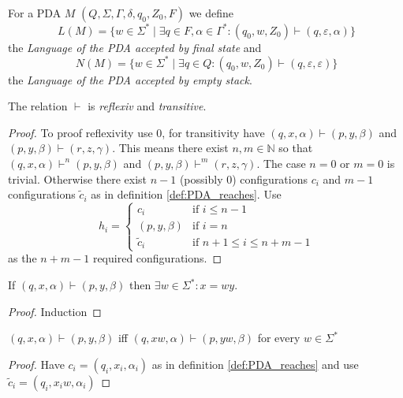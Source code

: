 \begin{definition}
  \label{def:PDA_language}
  For a PDA $M$ $(Q,\Sigma,\Gamma,\delta,q_0,Z_0,F)$ we define $$L(M)=\{w\in\Sigma^*\mid
  \exists q\in F,\alpha\in\Gamma^*: (q_0,w,Z_0)\vdash(q,\varepsilon,\alpha)\}$$ the
  \emph {Language of the PDA accepted by final state} and $$N(M)=\{w\in\Sigma^*\mid
  \exists q\in Q: (q_0,w,Z_0)\vdash(q,\varepsilon,\varepsilon)\}$$ the
  \emph {Language of the PDA accepted by empty stack}.

\end{definition}
\begin{theorem}\label{thm:PDA_reaches}
  The relation $\vdash$ is \emph{reflexiv} and \emph{transitive}.
\end{theorem}
\begin{proof}
  To proof reflexivity use $0$,
  for transitivity have  $(q,x,\alpha)\vdash(p,y,\beta)$ and
  $(p,y,\beta)\vdash(r,z,\gamma)$. This means there exist $n,m\in\mathbb{N}$ so that
  $(q,x,\alpha)\vdash^n(p,y,\beta)$ and $(p,y,\beta)\vdash^m(r,z,\gamma)$.
  The case $n=0$ or $m=0$ is trivial. Otherwise there exist $n-1$ (possibly $0$) configurations
  $c_i$ and $m-1$ configurations $\tilde{c}_i$ as in definition \ref{def:PDA_reaches}.
  Use
  $$
  h_i =
  \begin{cases}
    c_i          & \text{if } i\le n-1 \\
    (p,y,\beta) & \text{if } i = n \\
    \tilde{c}_i  & \text{if } n+1\le i \le n+m-1
  \end{cases}
  $$
  as the $n+m-1$ required configurations.
\end{proof}
\begin{theorem}\label{thm:PDA_reaches_input_decreasing}
  If $(q,x,\alpha)\vdash(p,y,\beta)$ then $\exists w\in\Sigma^*: x=wy$.
\end{theorem}
\begin{proof}
  Induction
\end{proof}
\begin{theorem}\label{thm:PDA_reaches_unconsumed_input}
  $(q,x,\alpha)\vdash(p,y,\beta)$ iff $(q,xw,\alpha)\vdash(p,yw,\beta)$ for
  every $w\in\Sigma^*$
\end{theorem}
\begin{proof}
  Have $c_i = (q_i,x_i,\alpha_i)$ as in definition \ref{def:PDA_reaches} and use
  $\tilde{c}_i = (q_i,x_iw,\alpha_i)$
\end{proof}
